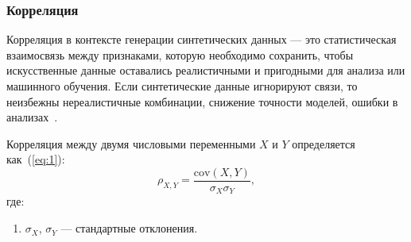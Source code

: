 
\subsubsection{Корреляция}

Корреляция в контексте генерации синтетических данных --- это статистическая взаимосвязь между признаками, которую необходимо сохранить, чтобы искусственные данные оставались реалистичными и пригодными для анализа или машинного обучения.
Если синтетические данные игнорируют связи, то неизбежны нереалистичные комбинации, снижение точности моделей, ошибки в анализах~\cite{uch}.

Корреляция между двумя числовыми переменными $X$ и $Y$ определяется как~(\ref{eq:1}):
\begin{equation}\label{eq:1}
    \rho_{X,Y} = \frac{\text{cov}(X,Y)}{\sigma_X \sigma_Y},
\end{equation}
где: 
\begin{enumerate}[label*=---]
	\item  $\sigma_X$, $\sigma_Y$ --- стандартные отклонения.
\end{enumerate}

